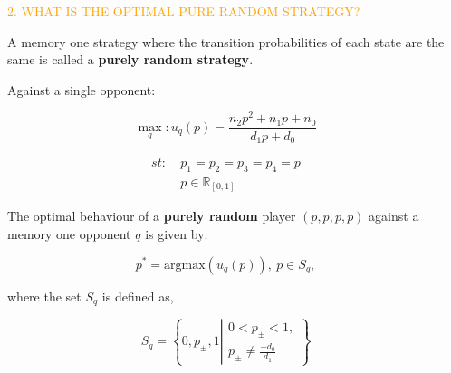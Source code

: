 \documentclass[usenames,dvipsnames,t]{beamer}
\newcommand{\R}{\mathbb{R}}
\begin{document}
\begin{columns}
    \begin{column}{.05\linewidth}
    \end{column}
    \begin{column}{.45\linewidth}
        \vspace{0.9cm}
    
        \textcolor{orange}{\large{2. WHAT IS THE OPTIMAL PURE RANDOM STRATEGY?}}
        \vspace{0.3cm}

        \small{
        A memory one strategy where the transition probabilities of each
        state are the same is called a \textbf{purely random strategy}.}
        \vspace{0.5cm}

        \textcolor{solarizedGreen}{Against a single opponent:}
        \vspace{0.3cm}

        \[ \max_q: u_q(p) = \frac{n_2p^2 + n_1p +n_0 } {d_1p + d_0}\]
        \vspace{0.3cm}

        \begin{equation*}
            \begin{aligned}
                st: & \ p_1 = p_2 = p_3 = p_4 = p\\
                & \ p \in \R_{[0, 1]} 
            \end{aligned}
        \end{equation*}
        \vspace{0.3cm}

        \small{
        The optimal behaviour of a \textbf{purely random} player \((p, p, p, p)\)
        against a memory one opponent \(q\) is given by:}
        
        \[p^* = \text{argmax}(u_q(p)), \ p \in S_q,\]
        \vspace{0.3cm}

        \small{
        where the set \(S_q\) is defined as,}
        
        \[S_q = \left \{0, p_{\pm}, 1 \left | \begin{array}{l} 0 < p_{\pm} < 1,
            \\ p_{\pm} \neq \frac{-d_0}{d_1} \end{array} \right. \right\}\]
        \vspace{0.5cm}
        

\end{column}
\end{columns}
\end{document}
